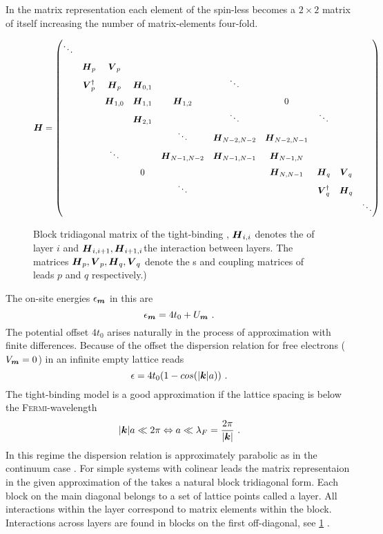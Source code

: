 In the matrix representation each element of the spin-less \hamil{} becomes a $2 \times 2$ matrix of itself increasing the number of matrix-elements four-fold.
\begin{figure}[h!]
\centering
\begin{align*}
\mat{H}=
\renewcommand*{\arraystretch}{1.5}
\begin{pmatrix} 
\ddots& & & & & & & & & \\
& \mat{H}_p& \mat{V}_p& & & && &&\\
& \mat{V}^{\dagger}_p& \mat{H}_p& \mat{H}_{0,1}& &\ddots& & &\\
& &\mat{H}_{1,0}&\mat{H}_{1,1} &\mat{H}_{1,2} & &0 & &\\
& & &\mat{H}_{2,1} & &\ddots & &\ddots &\\
& & & &\ddots &\mat{H}_{N-2,N-2} &\mat{H}_{N-2,N-1} & &\\
& & \ddots& &\mat{H}_{N-1,N-2} &\mat{H}_{N-1,N-1} &\mat{H}_{N-1,N} &\\
& & &0 & & &\mat{H}_{N,N-1} &\mat{H}_q &\mat{V}_q\\
& & & &\ddots & & &\mat{V}^{\dagger}_q &\mat{H}_q\\
& & & & & & && &\ddots
\end{pmatrix}
\end{align*}
\caption{Block tridiagonal matrix of the tight-binding \hamil{}, $\boldsymbol{H}_{i,i}$ denotes the \hamil{} of layer $i$ and $\boldsymbol{H}_{i,i+1},\boldsymbol{H}_{i+1,i}$the interaction between layers. The matrices $\boldsymbol{H}_p,\boldsymbol{V}_p,\boldsymbol{H}_q,\boldsymbol{V}_q$ denote the \hamil s and coupling matrices of leads $p$ and $q$ respectively.)}
\label{fig:blocktridiagonal}
\end{figure}
The on-site energies $\epsilon_{\boldsymbol{m}}$ in this \hamil{} are
\begin{equation}
\epsilon_{\boldsymbol{m}} = 4t_0 + U_{\boldsymbol{m}}\ .
\end{equation}
The potential offset $4t_0$ arises naturally in the process of approximation with finite differences. Because of the offset the dispersion relation for free electrons ($V_{\boldsymbol{m}}=0$) in an infinite empty lattice reads
\begin{equation}
\epsilon = 4t_0(1-cos(\lvert\boldsymbol{k}\rvert a))\ .
\end{equation}
The tight-binding model is a good approximation if the lattice spacing is below the \textsc{Fermi}-wavelength
\begin{equation}
\lvert\boldsymbol{k}\rvert a \ll  2\pi \Leftrightarrow a \ll \lambda_F = \frac{2\pi}{\lvert\boldsymbol{k}\rvert} \ .
\end{equation}
In this regime the dispersion relation is approximately parabolic as in the continuum case \cite{Metalidis2007Thesis}.
For simple systems with colinear leads the matrix representaion in the given approximation of the \hamil{} takes a natural block tridiagonal form. Each block on the main diagonal belongs to a set of lattice points called a layer. All interactions within the layer correspond to matrix elements within the block. Interactions across layers are found in blocks on the first off-diagonal, see \cref{fig:blocktridiagonal} \cite{AnLunNik2008}.
